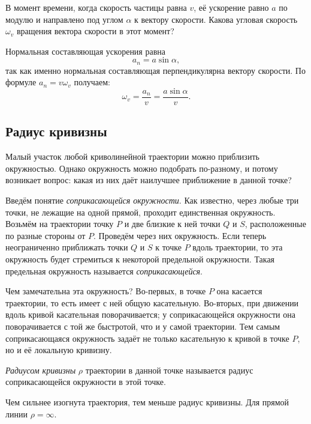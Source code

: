 \documentclass[../main.tex]{subfiles}
\begin{document}
\begin{example}
В момент времени, когда скорость частицы равна $v$, её ускорение равно $a$
по модулю и направлено под углом $\alpha$ к вектору скорости. Какова
угловая скорость $\omega_v$ вращения вектора скорости в этот момент?

Нормальная составляющая ускорения равна
\[
a_n = a\sin\alpha,
\]
так как именно нормальная составляющая перпендикулярна вектору скорости. По формуле
$a_n = v\omega_v$ получаем:
\[
\omega_v = \frac{a_n}{v} = \frac{a\sin\alpha}{v}.
\]
\end{example}

\subsection{Радиус кривизны}

Малый участок любой криволинейной траектории можно приблизить окружностью.
Однако окружность можно подобрать по-разному, и потому возникает вопрос:
какая из них даёт наилучшее приближение в данной точке?

Введём понятие \textit{соприкасающейся окружности}. Как известно, через любые три точки, не лежащие на одной прямой, проходит единственная окружность. Возьмём на траектории точку $P$ и две близкие к ней точки $Q$ и $S$, расположенные по разные стороны от $P$. Проведём через них окружность. Если теперь неограниченно приближать точки $Q$ и $S$ к точке $P$ вдоль траектории, то эта окружность будет стремиться к некоторой предельной окружности. Такая предельная окружность называется \textit{соприкасающейся}.

Чем замечательна эта окружность? Во-первых, в точке $P$ она касается траектории, то есть имеет с ней общую касательную. Во-вторых, при движении вдоль кривой касательная поворачивается; у соприкасающейся окружности она поворачивается с той же быстротой, что и у самой траектории. Тем самым соприкасающаяся окружность задаёт не только касательную к кривой в точке $P$, но и её локальную кривизну.

\begin{definition}
\textit{Радиусом кривизны} $\rho$ траектории в данной точке называется
радиус соприкасающейся окружности в этой точке.
\end{definition}

Чем сильнее изогнута траектория, тем меньше радиус кривизны. Для прямой
линии $\rho = \infty$.
\end{document}
